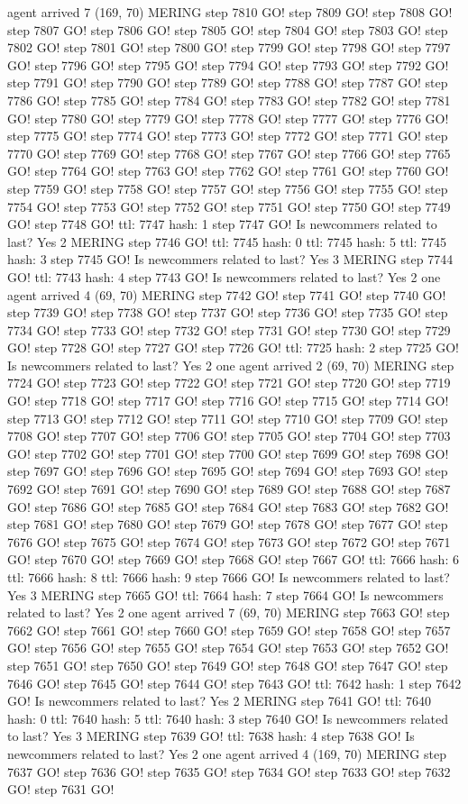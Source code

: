 agent arrived 7 (169, 70) MERING step 7810 GO! step 7809 GO! step 7808 GO! step 7807 GO! step 7806 GO! step 7805 GO! step 7804 GO! step 7803 GO! step 7802 GO! step 7801 GO! step 7800 GO! step 7799 GO! step 7798 GO! step 7797 GO! step 7796 GO! step 7795 GO! step 7794 GO! step 7793 GO! step 7792 GO! step 7791 GO! step 7790 GO! step 7789 GO! step 7788 GO! step 7787 GO! step 7786 GO! step 7785 GO! step 7784 GO! step 7783 GO! step 7782 GO! step 7781 GO! step 7780 GO! step 7779 GO! step 7778 GO! step 7777 GO! step 7776 GO! step 7775 GO! step 7774 GO! step 7773 GO! step 7772 GO! step 7771 GO! step 7770 GO! step 7769 GO! step 7768 GO! step 7767 GO! step 7766 GO! step 7765 GO! step 7764 GO! step 7763 GO! step 7762 GO! step 7761 GO! step 7760 GO! step 7759 GO! step 7758 GO! step 7757 GO! step 7756 GO! step 7755 GO! step 7754 GO! step 7753 GO! step 7752 GO! step 7751 GO! step 7750 GO! step 7749 GO! step 7748 GO! ttl: 7747 hash: 1 step 7747 GO! Is newcommers related to last? Yes 2 MERING step 7746 GO! ttl: 7745 hash: 0 ttl: 7745 hash: 5 ttl: 7745 hash: 3 step 7745 GO! Is newcommers related to last? Yes 3 MERING step 7744 GO! ttl: 7743 hash: 4 step 7743 GO! Is newcommers related to last? Yes 2 one agent arrived 4 (69, 70) MERING step 7742 GO! step 7741 GO! step 7740 GO! step 7739 GO! step 7738 GO! step 7737 GO! step 7736 GO! step 7735 GO! step 7734 GO! step 7733 GO! step 7732 GO! step 7731 GO! step 7730 GO! step 7729 GO! step 7728 GO! step 7727 GO! step 7726 GO! ttl: 7725 hash: 2 step 7725 GO! Is newcommers related to last? Yes 2 one agent arrived 2 (69, 70) MERING step 7724 GO! step 7723 GO! step 7722 GO! step 7721 GO! step 7720 GO! step 7719 GO! step 7718 GO! step 7717 GO! step 7716 GO! step 7715 GO! step 7714 GO! step 7713 GO! step 7712 GO! step 7711 GO! step 7710 GO! step 7709 GO! step 7708 GO! step 7707 GO! step 7706 GO! step 7705 GO! step 7704 GO! step 7703 GO! step 7702 GO! step 7701 GO! step 7700 GO! step 7699 GO! step 7698 GO! step 7697 GO! step 7696 GO! step 7695 GO! step 7694 GO! step 7693 GO! step 7692 GO! step 7691 GO! step 7690 GO! step 7689 GO! step 7688 GO! step 7687 GO! step 7686 GO! step 7685 GO! step 7684 GO! step 7683 GO! step 7682 GO! step 7681 GO! step 7680 GO! step 7679 GO! step 7678 GO! step 7677 GO! step 7676 GO! step 7675 GO! step 7674 GO! step 7673 GO! step 7672 GO! step 7671 GO! step 7670 GO! step 7669 GO! step 7668 GO! step 7667 GO! ttl: 7666 hash: 6 ttl: 7666 hash: 8 ttl: 7666 hash: 9 step 7666 GO! Is newcommers related to last? Yes 3 MERING step 7665 GO! ttl: 7664 hash: 7 step 7664 GO! Is newcommers related to last? Yes 2 one agent arrived 7 (69, 70) MERING step 7663 GO! step 7662 GO! step 7661 GO! step 7660 GO! step 7659 GO! step 7658 GO! step 7657 GO! step 7656 GO! step 7655 GO! step 7654 GO! step 7653 GO! step 7652 GO! step 7651 GO! step 7650 GO! step 7649 GO! step 7648 GO! step 7647 GO! step 7646 GO! step 7645 GO! step 7644 GO! step 7643 GO! ttl: 7642 hash: 1 step 7642 GO! Is newcommers related to last? Yes 2 MERING step 7641 GO! ttl: 7640 hash: 0 ttl: 7640 hash: 5 ttl: 7640 hash: 3 step 7640 GO! Is newcommers related to last? Yes 3 MERING step 7639 GO! ttl: 7638 hash: 4 step 7638 GO! Is newcommers related to last? Yes 2 one agent arrived 4 (169, 70) MERING step 7637 GO! step 7636 GO! step 7635 GO! step 7634 GO! step 7633 GO! step 7632 GO! step 7631 GO! 